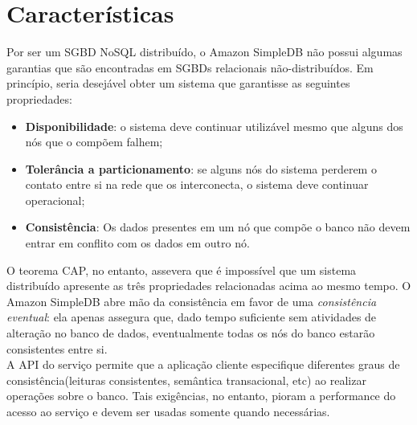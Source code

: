\section{Características}
	Por ser um SGBD NoSQL distribuído, o Amazon SimpleDB não possui algumas garantias que são encontradas em SGBDs relacionais não-distribuídos. Em princípio, seria desejável obter um sistema que garantisse as seguintes propriedades:
\begin{itemize}
	\item
	\textbf{Disponibilidade}: o sistema deve continuar utilizável mesmo que alguns dos nós que o compõem falhem;
	
	\item
	\textbf{Tolerância a particionamento}: se alguns nós do sistema perderem o contato entre si na rede que os interconecta, o sistema deve continuar operacional;
	
	\item
	\textbf{Consistência}: Os dados presentes em um nó que compõe o banco não devem entrar em conflito com os dados em outro nó.
\end{itemize}

	O teorema CAP, no entanto, assevera que é impossível que um sistema distribuído apresente as três propriedades relacionadas acima ao mesmo tempo\cite{WikiCapTheo}. O Amazon SimpleDB abre mão da consistência em favor de uma \textit{consistência eventual}: ela apenas assegura que, dado tempo suficiente sem atividades de alteração no banco de dados, eventualmente todas os nós do banco estarão consistentes entre si\cite{WikiEvCons}.\\
	A API do serviço permite que a aplicação cliente especifique diferentes graus de consistência(leituras consistentes, semântica transacional, etc) ao realizar operações sobre o banco. Tais exigências, no entanto, pioram a performance do acesso ao serviço e devem ser usadas somente quando necessárias.

